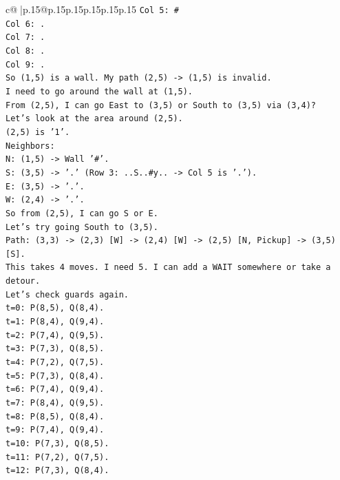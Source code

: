 \documentclass{article}
\begin{document}
{\begin{supertabular}{c@{$\;$}|p{.15\linewidth}@{}p{.15\linewidth}p{.15\linewidth}p{.15\linewidth}p{.15\linewidth}p{.15\linewidth}}
{{{\texttt{Col 5: \#} \\
\texttt{Col 6: .} \\
\texttt{Col 7: .} \\
\texttt{Col 8: .} \\
\texttt{Col 9: .} \\
\texttt{So (1,5) is a wall. My path (2,5) {-}> (1,5) is invalid.} \\
\texttt{I need to go around the wall at (1,5).} \\
\texttt{From (2,5), I can go East to (3,5) or South to (3,5) via (3,4)?} \\
\texttt{Let's look at the area around (2,5).} \\
\texttt{(2,5) is '1'.} \\
\texttt{Neighbors:} \\
\texttt{N: (1,5) {-}> Wall '\#'.} \\
\texttt{S: (3,5) {-}> '.' (Row 3: ..S..\#y.. {-}> Col 5 is '.').} \\
\texttt{E: (3,5) {-}> '.'.} \\
\texttt{W: (2,4) {-}> '.'.} \\
\texttt{So from (2,5), I can go S or E.} \\
\texttt{Let's try going South to (3,5).} \\
\texttt{Path: (3,3) {-}> (2,3) {[}W{]} {-}> (2,4) {[}W{]} {-}> (2,5) {[}N, Pickup{]} {-}> (3,5) {[}S{]}.} \\
\texttt{This takes 4 moves. I need 5. I can add a WAIT somewhere or take a detour.} \\
\texttt{Let's check guards again.} \\
\texttt{t=0: P(8,5), Q(8,4).} \\
\texttt{t=1: P(8,4), Q(9,4).} \\
\texttt{t=2: P(7,4), Q(9,5).} \\
\texttt{t=3: P(7,3), Q(8,5).} \\
\texttt{t=4: P(7,2), Q(7,5).} \\
\texttt{t=5: P(7,3), Q(8,4).} \\
\texttt{t=6: P(7,4), Q(9,4).} \\
\texttt{t=7: P(8,4), Q(9,5).} \\
\texttt{t=8: P(8,5), Q(8,4).} \\
\texttt{t=9: P(7,4), Q(9,4).} \\
\texttt{t=10: P(7,3), Q(8,5).} \\
\texttt{t=11: P(7,2), Q(7,5).} \\
\texttt{t=12: P(7,3), Q(8,4).} \\
}}}
\end{supertabular}}
\end{document}
